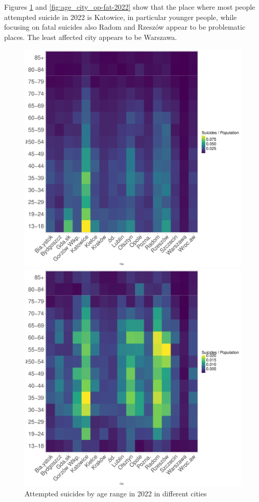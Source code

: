 \documentclass{article}
\begin{document}
Figures \ref{fig:age_city_op-att-2022}
and \ref{fig:age_city_op-fat-2022}
show that
the place where most people attempted suicide in 2022 is Katowice, 
in particular younger people, while focusing on fatal suicides 
also Radom and Rzeszów appear to be problematic places.
The least affected city appears to be Warszawa.
%
\begin{figure}[H]
    \centering
    \begin{minipage}{0.65\textwidth}
        \includegraphics[width=\textwidth]{imgs/age_city_op-att-2022.pdf}
        \caption{Attempted suicides by age range in 2022 in different cities}
	\label{fig:age_city_op-att-2022}
    \end{minipage}
    \hfill
    \begin{minipage}{0.65\textwidth}
        \includegraphics[width=\textwidth]{imgs/age_city_op-fat-2022.pdf}

\end{minipage}
\end{figure}
\end{document}
